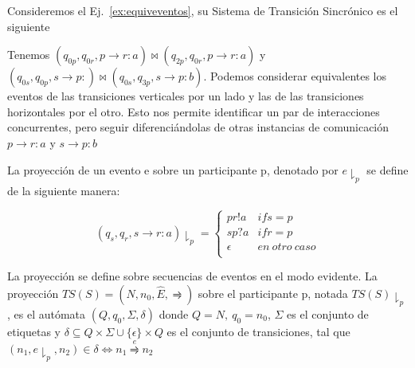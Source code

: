 \begin{example} 
\label{ex:STS}
Consideremos el Ej.~\ref{ex:equiveventos}, su Sistema de Transición Sincrónico es el siguiente


Tenemos $(q_{0p}, q_{0r}, p \rightarrow r:a) \bowtie (q_{2p}, q_{0r}, p \rightarrow r:a)$ y $(q_{0s}, q_{0p}, s \rightarrow p:) \bowtie (q_{0s}, q_{3p}, s \rightarrow p:b)$. Podemos considerar equivalentes los eventos de las transiciones verticales por un lado y las de las transiciones horizontales por el otro. Esto nos permite identificar un par de interacciones concurrentes, pero seguir diferenciándolas de otras instancias de comunicación $p \rightarrow r:a$ y $s \rightarrow p:b$
\end{example}

\begin{definition}[Proyecciones] La proyección de un evento e sobre un participante p, denotado por $e \downharpoonright_p$ se define de la siguiente manera:

\begin{equation}
(q_s,q_r,s \rightarrow r:a) \downharpoonright_p = \begin{cases} 
pr!a & \mathit{if} s=p \\
sp?a & \mathit{if} r=p \\
\epsilon & \mathit{en \ otro \ caso} \\
\end{cases} 
\end{equation}

La proyección se define sobre secuencias de eventos en el modo evidente. La proyección $TS(S)= (N, n_0, \hat{E}, \rightrightharpoons)$ sobre el participante p, notada $ TS(S) \downharpoonright_p $, es el autómata $(Q, q_0, \Sigma, \delta)$ donde $Q=N, \ q_0 = n_0$, $\Sigma$ es el conjunto de etiquetas y $\delta \subseteq Q \times \Sigma \cup \{ \epsilon \} \times Q $ es el conjunto de transiciones, tal que $(n_1, e \downharpoonright_p, n_2) \in \delta \iff n_1 \overset{e}{\rightrightharpoons} n_2 $

\end{definition}

